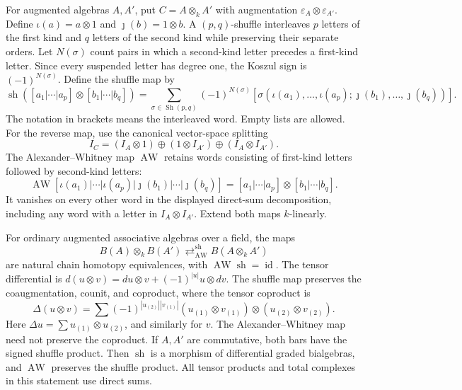 For augmented algebras $A,A'$, put $C=A\otimes_k A'$ with
augmentation $\varepsilon_A\otimes\varepsilon_{A'}$. Define
$\iota(a)=a\otimes1$ and $\jmath(b)=1\otimes b$.
A $(p,q)$-shuffle interleaves $p$ letters of the first kind and $q$
letters of the second kind while preserving their separate orders.
Let $N(\sigma)$ count pairs in which a second-kind letter precedes a
first-kind letter. Since every suspended letter has degree one, the
Koszul sign is $(-1)^{N(\sigma)}$. Define the shuffle map by
\begin{equation}\label{eq:intro-bar-shuffle}
 \operatorname{sh}([a_1|\cdots|a_p]\otimes[b_1|\cdots|b_q])
 =\sum_{\sigma\in\operatorname{Sh}(p,q)}(-1)^{N(\sigma)}
 [\sigma(\iota(a_1),\ldots,\iota(a_p);
                 \jmath(b_1),\ldots,\jmath(b_q))].
\end{equation}
The notation in brackets means the interleaved word. Empty lists are
allowed. For the reverse map, use the canonical vector-space splitting
\[
 I_C=(I_A\otimes1)\oplus(1\otimes I_{A'})
                  \oplus(I_A\otimes I_{A'}).
\]
The Alexander--Whitney map $\operatorname{AW}$ retains words consisting
of first-kind letters followed by second-kind letters:
\begin{equation}\label{eq:intro-bar-aw}
 \operatorname{AW}
 [\iota(a_1)|\cdots|\iota(a_p)|\jmath(b_1)|\cdots|\jmath(b_q)]
 =[a_1|\cdots|a_p]\otimes[b_1|\cdots|b_q].
\end{equation}
It vanishes on every other word in the displayed direct-sum
decomposition, including any word with a letter in $I_A\otimes I_{A'}$.
Extend both maps $k$-linearly.

\begin{proposition}
\label{prop:intro-bar-tensor-comparison}
For ordinary augmented associative algebras over a field, the maps
\[
 B(A)\otimes_k B(A')
 \mathrel{\mathop{\rightleftarrows}^{\operatorname{sh}}_{\operatorname{AW}}}
 B(A\otimes_k A')
\]
are natural chain homotopy equivalences, with
$\operatorname{AW}\operatorname{sh}=\operatorname{id}$.
The tensor differential is
$d(u\otimes v)=du\otimes v+(-1)^{|u|}u\otimes dv$.
The shuffle map preserves the coaugmentation, counit, and coproduct,
where the tensor coproduct is
\[
 \Delta(u\otimes v)
 =\sum(-1)^{|u_{(2)}||v_{(1)}|}
 (u_{(1)}\otimes v_{(1)})\otimes(u_{(2)}\otimes v_{(2)}).
\]
Here $\Delta u=\sum u_{(1)}\otimes u_{(2)}$, and similarly for $v$.
The Alexander--Whitney map need not preserve the coproduct.
If $A,A'$ are commutative, both bars have the signed shuffle product.
Then $\operatorname{sh}$ is a morphism of differential graded
bialgebras, and $\operatorname{AW}$ preserves the shuffle product.
All tensor products and total complexes in this statement use direct sums.
\end{proposition}

